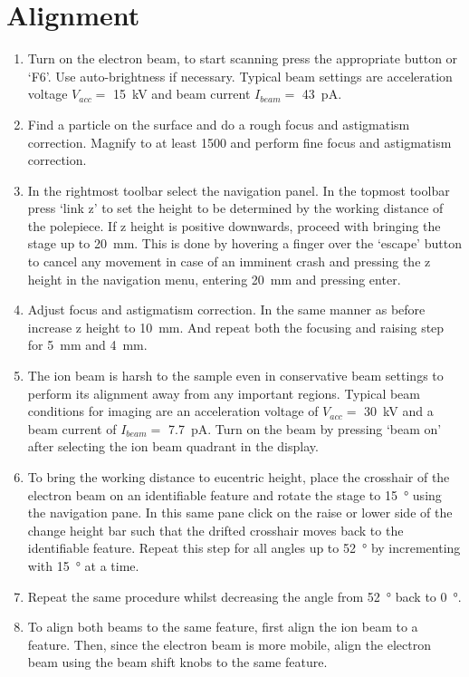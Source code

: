 \documentclass[a4paper]{scrartcl}
\begin{document}
\section*{Alignment}
\begin{enumerate}
	\item Turn on the electron beam, to start scanning press the appropriate button or `F6'. Use auto-brightness if necessary. Typical beam settings are acceleration voltage $V_{acc}=$ \SI{15}{\kilo \volt} and beam current $I_{beam}=$ \SI{43}{\pico \ampere}.
	\item Find a particle on the surface and do a rough focus and astigmatism correction. Magnify to at least \SI{1500}{\times} and perform fine focus and astigmatism correction.
	\item In the rightmost toolbar select the navigation panel. In the topmost toolbar press `link z' to set the height to be determined by the working distance of the polepiece. \colorbox{warning!30}{If z height is positive downwards, proceed} with bringing the stage up to \SI{20}{\milli \meter}. This is done by hovering a finger over the `escape' button to cancel any movement in case of an imminent crash and pressing the z height in the navigation menu, entering \SI{20}{\milli \meter} and pressing enter.
	\item Adjust focus and astigmatism correction. In the same manner as before increase z height to \SI{10}{\milli \meter}. And repeat both the focusing and raising step for \SI{5}{\milli \meter} and \SI{4}{\milli \meter}.
	\item The ion beam is harsh to the sample even in conservative beam settings to perform its alignment away from any important regions. Typical beam conditions for imaging are an acceleration voltage of $V_{acc}=$ \SI{30}{\kilo \volt} and a beam current of $I_{beam}=$ \SI{7.7}{\pico \ampere}. Turn on the beam by pressing `beam on' after selecting the ion beam quadrant in the display.
	\item To bring the working distance to eucentric height, place the crosshair of the electron beam on an identifiable feature and rotate the stage to \SI{15}{\degree} using the navigation pane. In this same pane \colorbox{warning!30}{click} on the raise or lower side of the change height bar such that the drifted crosshair moves back to the identifiable feature. Repeat this step for all angles up to \SI{52}{\degree} by incrementing with \SI{15}{\degree} at a time.
	\item Repeat the same procedure whilst decreasing the angle from \SI{52}{\degree} back to \SI{0}{\degree}.
	\item To align both beams to the same feature, first align the ion beam to a feature. Then, since the electron beam is more mobile, align the electron beam using the beam shift knobs to the same feature.
\end{enumerate}
\end{document}
